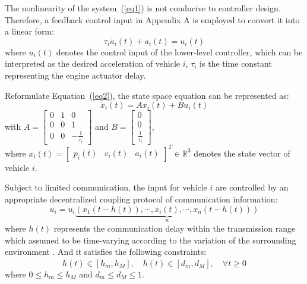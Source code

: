 \documentclass[a4paper]{cas-sc}
\begin{document}
The nonlinearity of the system~(\ref{eq1}) is not conducive to controller design. Therefore, a feedback control input in Appendix A is employed to convert it into a linear form:
\begin{equation}
  \tau_i\dot{a_i}\left(t\right)+a_i\left(t\right)=u_i(t)
  \label{eq2}
\end{equation}
where $u_i(t)$ denotes the control input of the lower-level controller, which can be interpreted as the desired acceleration of vehicle $i$, $\tau_i$ is the time constant representing the engine actuator delay.

Reformulate Equation~(\ref{eq2}), the state space equation can be represented as:
\begin{equation}
  {\dot x_i}\left( t \right) = A{x_i}\left( t \right) + B{u_i}\left( t \right)
  \label{eq3}
\end{equation}
with $A = \left[ {\begin{array}{*{20}{c}}
          0 & 1 & 0                          \\
          0 & 0 & 1                          \\
          0 & 0 & { - \frac{1}{{{\tau _i}}}}
        \end{array}} \right]$ and $B = \left[ {\begin{array}{*{20}{c}}
          0 \\
          0 \\
          {\frac{1}{{{\tau _i}}}}
        \end{array}} \right]$,\\
where ${x_i}\left( t \right) = {\left[ {\begin{array}{*{20}{c}}
          {{p_i}\left( t \right)} & {{v_i}\left( t \right)} & {{a_i}\left( t \right)}
        \end{array}} \right]^T} \in {\mathbb{R}^3}$ denotes the state vector of vehicle $i$.

Subject to limited communication, the input for vehicle $i$ are controlled by an appropriate decentralized coupling protocol of communication information:
\begin{equation}
  {u_i} = {u_i}\underbrace {\left( {{x_1}\left( {t - h(t)} \right), \cdots ,{x_i}\left( t \right), \cdots ,{x_n}\left( {t - h(t)} \right)} \right)}_n
  \label{eq4}
\end{equation}
where $ h(t) $ represents the communication delay within the transmission range which assumed to be time-varying according to the variation of the surrounding environment \citep{jia_enhanced_2016,Vukadinovic2018,Vu2020,Martin-Sacristan2020,Pirani2022}. And it satisfies the following constraints:
\begin{equation}
  h(t) \in \left[ {{h_m},{h_M}} \right],\quad \dot h(t) \in \left[ {{d_m},{d_M}} \right],\quad \forall t \geqslant 0
  \label{eq5}
\end{equation}
where $ 0 \leqslant {h_m} \leqslant {h_M} $ and $ {d_m} \leqslant {d_M} \leqslant 1 $.
\end{document}
